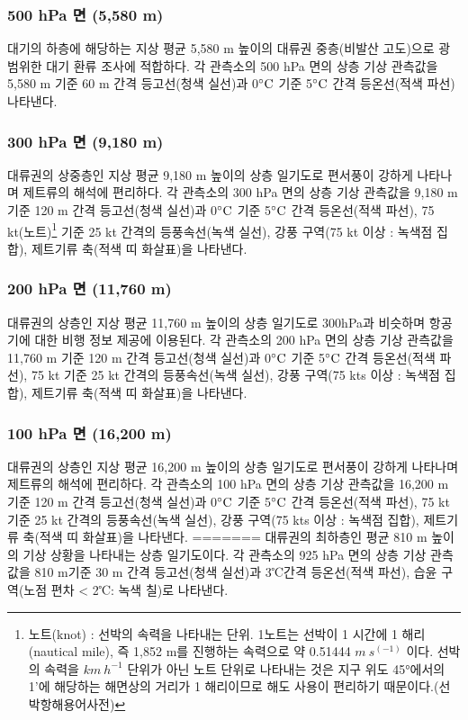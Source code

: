 \subsubsection{500 hPa 면 (5,580 m)}
대기의 하층에 해당하는 지상 평균 5,580 m 높이의 대류권 중층(비발산 고도)으로 광범위한 대기 환류 조사에 적합하다. 각 관측소의 500 hPa 면의 상층 기상 관측값을 5,580 m 기준 60 m 간격 등고선(청색 실선)과 0$\rm ^{\circ}C$ 기준 5$\rm ^{\circ}C$ 간격 등온선(적색 파선) 나타낸다. 

\subsubsection{300 hPa 면 (9,180 m)}
대류권의 상중층인 지상 평균 9,180 m 높이의 상층 일기도로 편서풍이 강하게 나타나며 제트류의 해석에 편리하다. 각 관측소의 300 hPa 면의 상층 기상 관측값을 9,180 m 기준 120 m 간격 등고선(청색 실선)과 0$\rm ^{\circ}C$ 기준 5$\rm ^{\circ}C$ 간격 등온선(적색 파선), 75 kt(노트)\footnote{노트(knot) : 선박의 속력을 나타내는 단위. 1노트는 선박이 1 시간에 1 해리 (nautical mile), 즉 1,852 m를 진행하는 속력으로 약 0.51444 $m~s^(-1)$ 이다. 선박의 속력을 $ km~h^{-1}$ 단위가 아닌 노트 단위로 나타내는 것은 지구 위도 45°에서의 1'에 해당하는 해면상의 거리가 1 해리이므로 해도 사용이 편리하기 때문이다.(선박항해용어사전)} 기준 25 kt 간격의 등풍속선(녹색 실선), 강풍 구역(75 kt 이상 :  녹색점 집합), 제트기류 축(적색 띠 화살표)을 나타낸다. 

\subsubsection{200 hPa 면 (11,760 m)}
대류권의 상층인 지상 평균 11,760 m 높이의 상층 일기도로 300hPa과 비슷하며 항공기에 대한 비행 정보 제공에 이용된다. 각 관측소의 200 hPa 면의 상층 기상 관측값을 11,760 m 기준 120 m 간격 등고선(청색 실선)과 0$\rm ^{\circ}C$ 기준 5$\rm ^{\circ}C$ 간격 등온선(적색 파선), 75 kt 기준 25 kt 간격의 등풍속선(녹색 실선), 강풍 구역(75 kts 이상 :  녹색점 집합), 제트기류 축(적색 띠 화살표)을 나타낸다. 

\subsubsection{100 hPa 면 (16,200 m)}
대류권의 상층인 지상 평균 16,200 m 높이의 상층 일기도로 편서풍이 강하게 나타나며 제트류의 해석에 편리하다. 각 관측소의 100 hPa 면의 상층 기상 관측값을 16,200 m 기준 120 m 간격 등고선(청색 실선)과 0$\rm ^{\circ}C$ 기준 5$\rm ^{\circ}C$ 간격 등온선(적색 파선), 75 kt 기준 25 kt 간격의 등풍속선(녹색 실선), 강풍 구역(75 kts 이상 :  녹색점 집합), 제트기류 축(적색 띠 화살표)을 나타낸다. 
=======
대류권의 최하층인 평균 810 m 높이의 기상 상황을 나타내는 상층 일기도이다. 각 관측소의 925 hPa 면의 상층 기상 관측값을 810 m기준 30 m 간격 등고선(청색 실선)과 3℃간격 등온선(적색 파선), 습윤 구역(노점 편차 < 2℃: 녹색 칠)로 나타낸다. 

